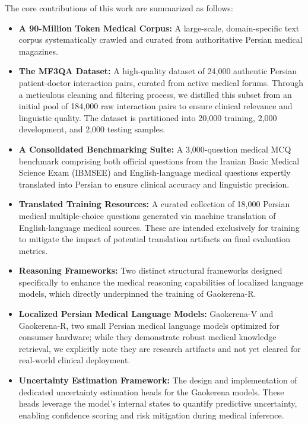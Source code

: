 \documentclass[review]{elsarticle}
\begin{document}
The core contributions of this work are summarized as follows:

\begin{itemize}

    \item \textbf{A 90-Million Token Medical Corpus:} A large-scale, domain-specific text corpus systematically crawled and curated from authoritative Persian medical magazines.

    \item \textbf{The MF3QA Dataset:} A high-quality dataset of 24,000 authentic Persian patient-doctor interaction pairs, curated from active medical forums. Through a meticulous cleaning and filtering process, we distilled this subset from an initial pool of 184,000 raw interaction pairs to ensure clinical relevance and linguistic quality. The dataset is partitioned into 20,000 training, 2,000 development, and 2,000 testing samples.

    \item \textbf{A Consolidated Benchmarking Suite:} A 3,000-question medical MCQ benchmark comprising both official questions from the Iranian Basic Medical Science Exam (IBMSEE) and English-language medical questions expertly translated into Persian to ensure clinical accuracy and linguistic precision.

    \item \textbf{Translated Training Resources:} A curated collection of 18,000 Persian medical multiple-choice questions generated via machine translation of English-language medical sources. These are intended exclusively for training to mitigate the impact of potential translation artifacts on final evaluation metrics.

    \item \textbf{Reasoning Frameworks:} Two distinct structural frameworks designed specifically to enhance the medical reasoning capabilities of localized language models, which directly underpinned the training of Gaokerena-R.

    \item \textbf{Localized Persian Medical Language Models:} Gaokerena-V and Gaokerena-R, two small Persian medical language models optimized for consumer hardware; while they demonstrate robust medical knowledge retrieval, we explicitly note they are research artifacts and not yet cleared for real-world clinical deployment.

    \item \textbf{Uncertainty Estimation Framework:} The design and implementation of dedicated uncertainty estimation heads for the Gaokerena models. These heads leverage the model’s internal states to quantify predictive uncertainty, enabling confidence scoring and risk mitigation during medical inference.

\end{itemize}
\end{document}
